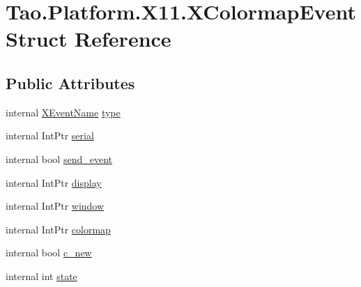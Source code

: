 \hypertarget{struct_tao_1_1_platform_1_1_x11_1_1_x_colormap_event}{
\section{Tao.Platform.X11.XColormapEvent Struct Reference}
\label{struct_tao_1_1_platform_1_1_x11_1_1_x_colormap_event}
}
\subsection*{Public Attributes}
\begin{DoxyCompactItemize}
\item 
internal \hyperlink{namespace_tao_1_1_platform_1_1_x11_aff81ed5b8778e1ea8e872861dff9f146}{XEventName} \hyperlink{struct_tao_1_1_platform_1_1_x11_1_1_x_colormap_event_a885be1d6b81430427eb346df34a8cc7c}{type}
\item 
internal IntPtr \hyperlink{struct_tao_1_1_platform_1_1_x11_1_1_x_colormap_event_acb6b25da4ca9fda215cfdca9a1710826}{serial}
\item 
internal bool \hyperlink{struct_tao_1_1_platform_1_1_x11_1_1_x_colormap_event_a59a9eb53b303ce80bcab0926041802a2}{send\_\-event}
\item 
internal IntPtr \hyperlink{struct_tao_1_1_platform_1_1_x11_1_1_x_colormap_event_ad55ed519a88be3649ad3725acc8cb56e}{display}
\item 
internal IntPtr \hyperlink{struct_tao_1_1_platform_1_1_x11_1_1_x_colormap_event_a2a3fe9af623899eac01a7f2f66d8c6f5}{window}
\item 
internal IntPtr \hyperlink{struct_tao_1_1_platform_1_1_x11_1_1_x_colormap_event_a5e54dd8ed6bbd6a653076a0cccbb750a}{colormap}
\item 
internal bool \hyperlink{struct_tao_1_1_platform_1_1_x11_1_1_x_colormap_event_a01a0a43e6ac568e317766bfb71cd09b0}{c\_\-new}
\item 
internal int \hyperlink{struct_tao_1_1_platform_1_1_x11_1_1_x_colormap_event_a06d2248e835e08304655e930dc27dfdc}{state}
\end{DoxyCompactItemize}


